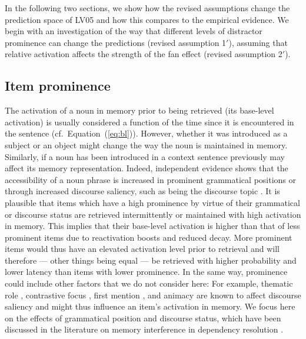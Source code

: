 \documentclass{cambridge7A}\usepackage[]{graphicx}\usepackage[]{color}
\begin{document}
In the following two sections, we show how the revised assumptions change the prediction space of LV05 and how this compares to the empirical evidence. 
We begin with an investigation of the way that different levels of distractor prominence can change the predictions (revised assumption 1$'$), assuming that relative activation affects the strength of the fan effect (revised assumption 2$'$).


\subsection{Item prominence}
\label{sec:prominence}

The activation of a noun in memory prior to being retrieved (its base-level activation) is usually considered a function of the time since it is encountered in the sentence (cf.\ Equation~(\ref{eq:bl})). 
However, whether it was introduced as a subject or an object might change the way the noun is maintained in memory. Similarly, if a noun has been introduced in a context sentence previously may affect its memory representation. Indeed, independent evidence shows that the  accessibility of a noun phrase is increased in prominent grammatical positions or through increased  discourse saliency, such as being the 
 discourse topic  \citep{Ariel1990,Arnold2007,  Brennan1995, Chafe1976, DuBois2003, GroszJoshiWeinstein1995,KeenanComrie1977}. It is plausible that items which have a high prominence by virtue of their grammatical or discourse status are retrieved intermittently or maintained with high activation in memory. This implies that their base-level activation is higher than that of less prominent items due to reactivation boosts and reduced decay.
More prominent items would thus have an elevated activation level prior to retrieval and will therefore --- other things being equal --- be retrieved with higher probability and lower latency than items with lower prominence.
In the same way, prominence could include other factors that we do not consider here: For example, thematic role \citep{Arnold2001}, contrastive focus \citep{CowlesWalenskiKluender2007}, first mention \citep{GernsbacherHargreaves1988}, and animacy \citep{FukumuraVanGompel2011} are known to affect discourse saliency and might thus influence an item's activation in memory.  
We focus here on the effects of grammatical position and  discourse status, which have been discussed in the literature on memory interference in dependency resolution \citep{VanDykeMcElree2011,CunningsFelser2013,PatilVasishthLewis2016,Sturt2003}.
\end{document}
